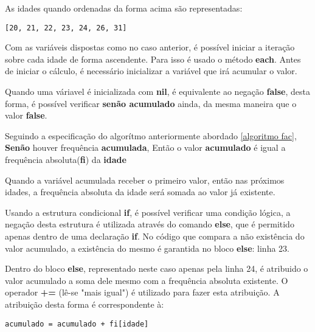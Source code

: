 \documentclass[12pt]{article}
\newcommand{\code}[1] {\textbf{#1}}
\begin{document}
As idades quando ordenadas da forma acima são representadas:

\begin{lstlisting}[caption=Idades das frequências absolutas ordenadas pelo método \code{sort}]
[20, 21, 22, 23, 24, 26, 31]
\end{lstlisting}

Com as variáveis dispostas como no caso anterior, é possível iniciar a iteração sobre cada idade de forma ascendente. Para isso é usado o método \code{each}. Antes de iniciar o cálculo, é necessário inicializar a variável que irá acumular o valor.


Quando uma váriavel é inicializada com \code{nil}, é equivalente ao negação \code{false}, desta forma, é possível verificar \textbf{senão acumulado} ainda, da mesma maneira que o valor \code{false}.

 

Seguindo a especificação do algorítmo anteriormente abordado \ref{algoritmo fac}, \code{Senão} houver frequência \code{acumulada}, Então o valor \code{acumulado} é igual a frequência absoluta(\code{fi}) da \code{idade} 

 

Quando a variável acumulada receber o primeiro valor, então nas próximos idades, a frequência absoluta da idade será somada ao valor já existente.

Usando a estrutura condicional \code{if}, é possível verificar uma condição lógica, a negação desta estrutura é utilizada através do comando \code{else}, que é permitido apenas dentro de uma declaração \code{if}. No código que compara a não existência do valor acumulado, a existência do mesmo é garantida no bloco \code{else}: linha 23.

 

Dentro do bloco \code{else}, representado neste caso apenas pela linha 24, é atribuido o valor acumulado a soma dele mesmo com a frequência absoluta existente. O operador \code{+=} (lê-se "mais igual") é utilizado para fazer esta atribuição. A atribuição desta forma é correspondente à:

\begin{lstlisting}[caption=Operador \code{+=} escrito de outra maneira ]
  acumulado = acumulado + fi[idade]
\end{lstlisting}
\end{document}
